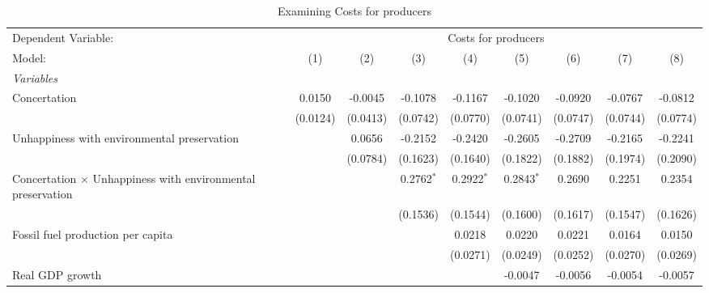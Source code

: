 
\begin{table}[htbp]
   \caption{Examining Costs for producers}
   \centering
   \begin{tabular}{lcccccccc}
      \tabularnewline \midrule \midrule
      Dependent Variable: & \multicolumn{8}{c}{Costs for producers}\\
      Model:                                                             & (1)      & (2)      & (3)          & (4)          & (5)          & (6)      & (7)            & (8)\\  
      \midrule
      \emph{Variables}\\
      Concertation                                                       & 0.0150   & -0.0045  & -0.1078      & -0.1167      & -0.1020      & -0.0920  & -0.0767        & -0.0812\\   
                                                                         & (0.0124) & (0.0413) & (0.0742)     & (0.0770)     & (0.0741)     & (0.0747) & (0.0744)       & (0.0774)\\   
      Unhappiness with environmental preservation                        &          & 0.0656   & -0.2152      & -0.2420      & -0.2605      & -0.2709  & -0.2165        & -0.2241\\   
                                                                         &          & (0.0784) & (0.1623)     & (0.1640)     & (0.1822)     & (0.1882) & (0.1974)       & (0.2090)\\   
      Concertation $\times$ Unhappiness with environmental preservation  &          &          & 0.2762$^{*}$ & 0.2922$^{*}$ & 0.2843$^{*}$ & 0.2690   & 0.2251         & 0.2354\\   
                                                                         &          &          & (0.1536)     & (0.1544)     & (0.1600)     & (0.1617) & (0.1547)       & (0.1626)\\   
      Fossil fuel production per capita                                  &          &          &              & 0.0218       & 0.0220       & 0.0221   & 0.0164         & 0.0150\\   
                                                                         &          &          &              & (0.0271)     & (0.0249)     & (0.0252) & (0.0270)       & (0.0269)\\   
      Real GDP growth                                                    &          &          &              &              & -0.0047      & -0.0056  & -0.0054        & -0.0057\\   

\end{tabular}
\end{table}
